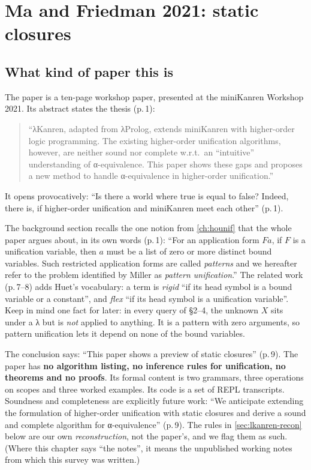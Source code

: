 \section{Ma and Friedman 2021: static closures}\label{sec:lkanren-mf21}

\subsection{What kind of paper this is}

The paper is a ten-page workshop paper, presented at the miniKanren Workshop 2021. Its abstract states
the thesis (p.\,1):
\begin{quote}
\enquote{λKanren, adapted from λProlog, extends miniKanren with higher-order logic programming.
The existing higher-order unification algorithms, however, are neither sound nor complete w.r.t.\ an
“intuitive” understanding of α-equi\-va\-lence. This paper shows these gaps and proposes a new method to
handle α-equi\-va\-lence in higher-order unification.}
\end{quote}
It opens provocatively: \enquote{Is there a world where true is equal to false? Indeed, there is, if
higher-order unification and miniKanren meet each other} (p.\,1).

The background section recalls the one notion from \cref{ch:hounif} that the whole paper argues
about, in its own words (p.\,1): \enquote{For an application form $Fa$, if $F$ is a unification
variable, then $a$ must be a list of zero or more distinct bound variables. Such restricted application
forms are called \emph{patterns} and we hereafter refer to the problem identified by Miller as
\emph{pattern unification}.} The related work (p.\,7--8) adds Huet's vocabulary: a term is \emph{rigid}
\enquote{if its head symbol is a bound variable or a constant}, and \emph{flex} \enquote{if its head symbol
is a unification variable}. Keep in mind one fact for later: in every query of §2--4, the unknown
$X$ sits under a λ but is \emph{not} applied to anything. It is a pattern with zero arguments, so
pattern unification lets it depend on none of the bound variables.

\begin{pitfall}
The conclusion says: \enquote{This paper shows a preview of static closures} (p.\,9). The paper has
\textbf{no algorithm listing, no inference rules for unification, no theorems and no proofs}. Its
formal content is two grammars, three operations on scopes and three worked examples. Its code is a
set of REPL transcripts. Soundness and completeness are explicitly future work: \enquote{We
anticipate extending the formulation of higher-order unification with static closures and derive a
sound and complete algorithm for α-equivalence} (p.\,9). The rules in \cref{sec:lkanren-recon} below
are our own \emph{reconstruction}, not the paper's, and we flag them as such. (Where this chapter
says \enquote{the notes}, it means the unpublished working notes from which this survey was written.)
\end{pitfall}

